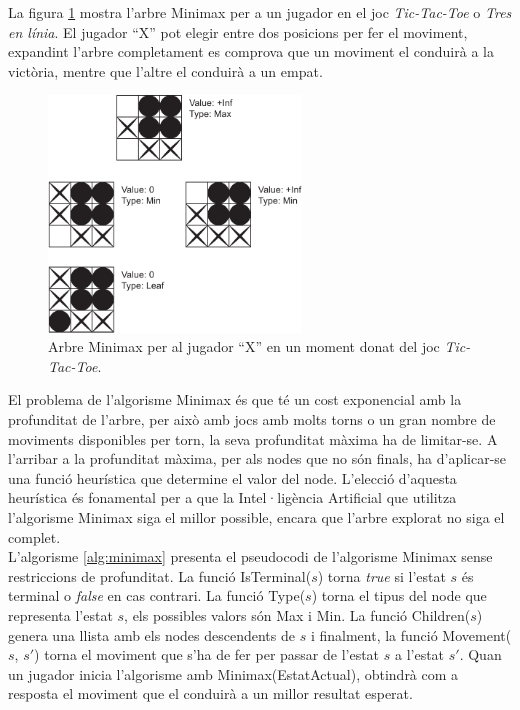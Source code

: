 \documentclass[12pt,a4paper]{article}
\begin{document}
La figura \ref{fig:minimax_tic_tac_toe} mostra l'arbre Minimax per a un jugador en el joc \emph{Tic-Tac-Toe} o \emph{Tres en línia}. El jugador ``X'' pot elegir entre dos posicions per fer el moviment, expandint l'arbre completament es comprova que un moviment el conduirà a la victòria, mentre que l'altre el conduirà a un empat.\\

\begin{figure}[h]
\centering
\includegraphics[width=0.6\textwidth]{minimax_tic_tac_toe.pdf}
\caption{Arbre Minimax per al jugador ``X'' en un moment donat del joc \emph{Tic-Tac-Toe}.}
\label{fig:minimax_tic_tac_toe}
\end{figure}

El problema de l'algorisme Minimax és que té un cost exponencial amb la profunditat de l'arbre, per això amb jocs amb molts torns o un gran nombre de moviments disponibles per torn, la seva profunditat màxima ha de limitar-se. A l'arribar a la profunditat màxima, per als nodes que no són finals, ha d'aplicar-se una funció heurística que determine el valor del node. L'elecció d'aquesta heurística és fonamental per a que la Intel·ligència Artificial que utilitza l'algorisme Minimax siga el millor possible, encara que l'arbre explorat no siga el complet.\\

L'algorisme \ref{alg:minimax} presenta el pseudocodi de l'algorisme Minimax sense restriccions de profunditat. La funció IsTerminal($s$) torna \emph{true} si l'estat $s$ és terminal o \emph{false} en cas contrari. La funció Type($s$) torna el tipus del node que representa l'estat $s$, els possibles valors són Max i Min. La funció Children($s$) genera una llista amb els nodes descendents de $s$ i finalment, la funció Movement($s$, $s'$) torna el moviment que s'ha de fer per passar de l'estat $s$ a l'estat $s'$. Quan un jugador inicia l'algorisme amb Minimax(EstatActual), obtindrà com a resposta el moviment que el conduirà a un millor resultat esperat.
\end{document}
